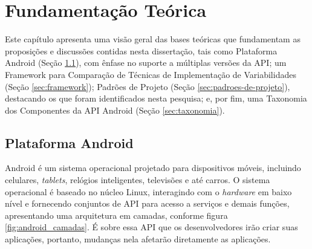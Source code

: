 \chapter{Fundamentação Teórica} \label{ch:fundamentacao-teorica}

Este capítulo apresenta uma visão geral das bases teóricas que fundamentam as
proposições  e  discussões  contidas  nesta  dissertação,  tais  como  Plataforma
Android (Seção \ref{sec:plataforma-android}), com ênfase no suporte a múltiplas
versões da API; um Framework para Comparação de Técnicas de Implementação de
Variabilidades (Seção \ref{sec:framework}); Padrões de Projeto (Seção
 \ref{sec:padroes-de-projeto}), 
destacando os que foram identificados nesta pesquisa;  e,
por fim, uma Taxonomia dos Componentes da API Android (Seção \ref{sec:taxonomia}). 

\section{Plataforma Android} \label{sec:plataforma-android}

Android é um sistema operacional projetado para dispositivos móveis, incluindo
celulares, \textit{tablets}, relógios inteligentes, televisões e até carros.
O sistema operacional é baseado no núcleo Linux, interagindo com o \textit{hardware}
em baixo nível e fornecendo conjuntos de API para acesso a serviços e demais
funções\cite{Lecheta2015}, apresentando uma arquitetura em camadas, conforme
figura \ref{fig:android_camadas}. É sobre essa API que os desenvolvedores irão
criar suas aplicações, portanto, mudanças nela afetarão diretamente as aplicações.

